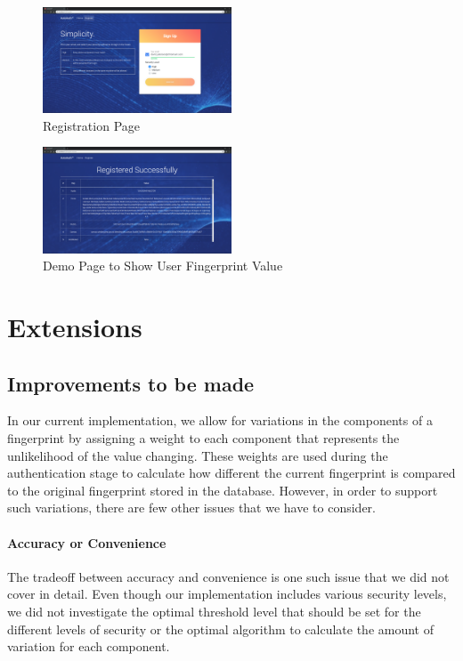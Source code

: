 \documentclass{acm_proc_article-sp}
\begin{document}
\begin{figure}[h]
    \centering
    \includegraphics[width=0.5\textwidth]{assets/fig1-ui-threshold-level.png}
    \caption{Registration Page}
    \label{fig:regis}
\end{figure}
\begin{figure}[h]
    \centering
    \includegraphics[width=0.5\textwidth]{assets/fig2-ui-fingerprint-components.png}
    \caption{Demo Page to Show User Fingerprint Value}
    \label{fig:fingerprint-comp}
\end{figure}

\section{Extensions}

\subsection{Improvements to be made}

In our current implementation, we allow for variations in the components of a fingerprint by assigning a weight to each component that represents the unlikelihood of the value changing. These weights are used during the authentication stage to calculate how different the current fingerprint is compared to the original fingerprint stored in the database. However, in order to support such variations, there are few other issues that we have to consider.

\paragraph{Accuracy or Convenience}
The tradeoff between accuracy and convenience is one such issue that we did not cover in detail. Even though our implementation includes various security levels, we did not investigate the optimal threshold level that should be set for the different levels of security or the optimal algorithm to calculate the amount of variation for each component. 
\end{document}
